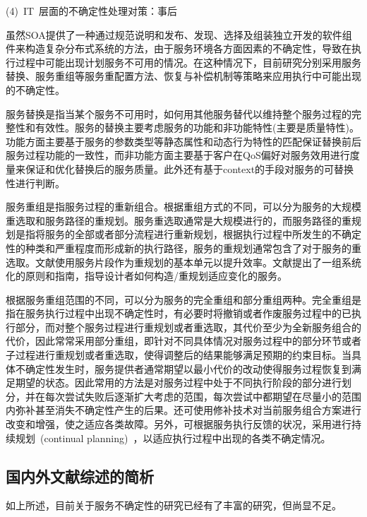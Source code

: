 (4)~IT~层面的不确定性处理对策：事后

虽然SOA提供了一种通过规范说明和发布、发现、选择及组装独立开发的软件组件来构造复杂分布式系统的方法，由于服务环境各方面因素的不确定性，导致在执行过程中可能出现计划服务不可用的情况。在这种情况下，目前研究分别采用服务替换、服务重组等服务重配置方法、恢复与补偿机制等策略来应用执行中可能出现的不确定性。

服务替换是指当某个服务不可用时，如何用其他服务替代以维持整个服务过程的完整性和有效性。服务的替换主要考虑服务的功能和非功能特性(主要是质量特性)。功能方面主要基于服务的参数类型等静态属性和动态行为特性的匹配保证替换前后服务过程功能的一致性，而非功能方面主要基于客户在QoS偏好对服务效用进行度量来保证和优化替换后的服务质量。此外还有基于context的手段对服务的可替换性进行判断。

服务重组是指服务过程的重新组合。根据重组方式的不同，可以分为服务的大规模重选取和服务路径的重规划。服务重选取通常是大规模进行的，而服务路径的重规划是指将服务的全部或者部分流程进行重新规划，根据执行过程中所发生的不确定性的种类和严重程度而形成新的执行路径，服务的重规划通常包含了对于服务的重选取。文献\cite{bouhini2010discovery}使用服务片段作为重规划的基本单元以提升效率。文献\cite{bucchiarone2010design}提出了一组系统化的原则和指南，指导设计者如何构造/重规划适应变化的服务。

根据服务重组范围的不同，可以分为服务的完全重组和部分重组两种。完全重组是指在服务执行过程中出现不确定性时，有必要时将撤销或者作废服务过程中的已执行部分，而对整个服务过程进行重规划或者重选取，其代价至少为全新服务组合的代价，因此常常采用部分重组，即针对不同具体情况对服务过程中的部分环节或者子过程进行重规划或者重选取，使得调整后的结果能够满足预期的约束目标。当具体不确定性发生时，服务提供者通常期望以最小代价的改动使得服务过程恢复到满足期望的状态。因此常用的方法是对服务过程中处于不同执行阶段的部分进行划分，并在每次尝试失败后逐渐扩大考虑的范围，每次尝试中都期望在尽量小的范围内弥补甚至消失不确定性产生的后果。还可使用修补技术对当前服务组合方案进行改变和增强，使之适应各类故障。另外，可根据服务执行反馈的状况，采用进行持续规划~(continual planning)~，以适应执行过程中出现的各类不确定情况。

\subsection{国内外文献综述的简析}
如上所述，目前关于服务不确定性的研究已经有了丰富的研究，但尚显不足。


